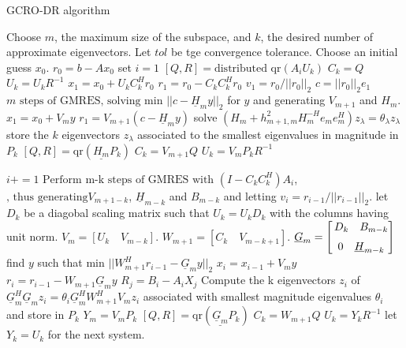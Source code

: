 \begin{algorithm}[htbp]{}
	\caption{GCRO-DR algorithm \cite{parks2006recycling}}   
	\label{alg:gcrdo}   
	\begin{algorithmic}[1]
		\State Choose $m$, the maximum size of the subspace, and $k$, the desired number of approximate eigenvectors. Let $tol$ be tge convergence tolerance. Choose an initial guess $x_0$. 
		\State $r_0=b-Ax_0$
		\State set $i=1$
				\State $[Q,R]=\text{distributed qr}(A_iU_k)$
				\State $C_k=Q$
				\State $U_k=U_kR^{-1}$ 	
			\EndIf
			\State $x_1=x_0+U_kC_k^Hr_0$
			\State $r_1=r_0-C_kC_k^Hr_0$
		\Else
			\State $v_1=r_0/||r_0||_2$
			\State $c=||r_0||_2e_1$
			\State $\text{$m$ steps of GMRES, solving min } ||c-\underline{H}_my||_2$ for $y$ and generating $V_{m+1}$ and ${H}_m$.
			\State $x_1=x_0+V_my$
			\State $r_1=V_{m+1}(c-\underline{H}_my)$
			\State solve $(H_m+h^2_{m+1,m}H_{m}^{-H}e_me_m^H)z_{\lambda}=\theta_{\lambda}z_{\lambda}$
			\State store the $k$ eigenvectors $z_{\lambda}$ associated to the smallest eigenvalues in magnitude in $P_k$
			\State $[Q,R]=\text{qr}(\underline{H_m}P_k)$
			\State $C_k=V_{m+1}Q$
			\State $U_k=V_mP_kR^{-1}$
		\EndIf
		
			\State $i+=1$
			\State $\text{Perform m-k steps of GMRES with}$ $(I-C_kC_k^H)A_i$, $\text{, thus generating} V_{m+1-k}$, $\underline{H}_{m-k}$ and $B_{m-k}$ and letting $v_i=r_{i-1}/||r_{i-1}||_2$.
			\State let $D_k$ be a diagobal scaling matrix such that $U_k=U_kD_k$ with the columns having unit norm.
			\State $V_m=[U_k \quad V_{m-k}]$.
			\State $W_{m+1}=[C_k \quad V_{m-k+1}]$.
			\State $\underline{G}_m=\begin{bmatrix}
			\,
			D_k \quad B_{m-k}
			\\[2\jot]
			\hfill 0 \quad \underline{H}_{m-k}
			\,
			\end{bmatrix}$
			\State find $y$ such that min $||W^H_{m+1}r_{i-1}-\underline{G}_my||_2$
			\State $x_i=x_{i-1}+V_my$
			\State $r_i=r_{i-1}-W_{m+1}\underline{G}_my$
			\State $R_j=B_i-A_iX_j$
				\State Compute the k eigenvectors $z_i$ of $\underline{G}_m^H\underline{G}_mz_i=\theta_i\underline{G}_m^HW_{m+1}^HV_mz_i$ associated with smallest magnitude eigenvalues $\theta_i$ and store in $P_k$
				\State $Y_m=V_mP_k$
				\State $[Q,R]=\text{qr}(\underline{\underline{G}_m}P_k)$
				\State $C_k=W_{m+1}Q$
				\State $U_k=Y_kR^{-1}$
			\EndIf
		\EndWhile
		\State let $Y_k=U_k$ for the next system.
	\end{algorithmic}  
\end{algorithm}


